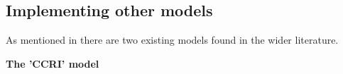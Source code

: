 
\subsection{Implementing other models}

As mentioned in  there are two existing models found in the wider literature. 

\textbf{The 'CCRI' model} 

